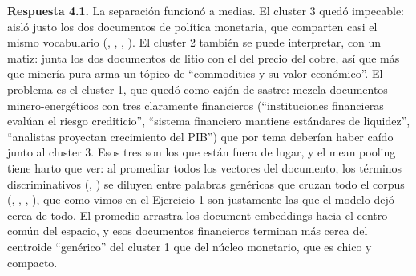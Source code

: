 \textbf{Respuesta 4.1.} La separación funcionó a medias. El cluster 3 quedó impecable: aisló justo los dos documentos de política monetaria, que comparten casi el mismo vocabulario (, , , ). El cluster 2 también se puede interpretar, con un matiz: junta los dos documentos de litio con el del precio del cobre, así que más que minería pura arma un tópico de ``commodities y su valor económico''. El problema es el cluster 1, que quedó como cajón de sastre: mezcla documentos minero-energéticos con tres claramente financieros (``instituciones financieras evalúan el riesgo crediticio'', ``sistema financiero mantiene estándares de liquidez'', ``analistas proyectan crecimiento del PIB'') que por tema deberían haber caído junto al cluster 3. Esos tres son los que están fuera de lugar, y el mean pooling tiene harto que ver: al promediar todos los vectores del documento, los términos discriminativos (, ) se diluyen entre palabras genéricas que cruzan todo el corpus (, , , ), que como vimos en el Ejercicio 1 son justamente las que el modelo dejó cerca de todo. El promedio arrastra los document embeddings hacia el centro común del espacio, y esos documentos financieros terminan más cerca del centroide ``genérico'' del cluster 1 que del núcleo monetario, que es chico y compacto.

